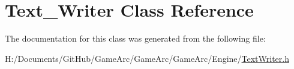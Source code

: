 \hypertarget{class_text___writer}{\section{Text\+\_\+\+Writer Class Reference}
\label{class_text___writer}
}


The documentation for this class was generated from the following file\+:\begin{DoxyCompactItemize}
\item 
H\+:/\+Documents/\+Git\+Hub/\+Game\+Arc/\+Game\+Arc/\+Game\+Arc/\+Engine/\hyperlink{_text_writer_8h}{Text\+Writer.\+h}\end{DoxyCompactItemize}
